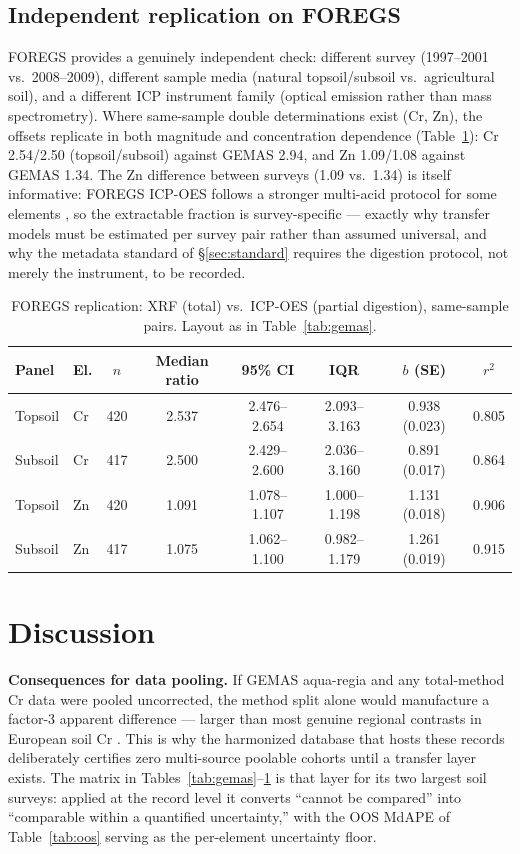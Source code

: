 \documentclass[11pt]{article}
\begin{document}
\subsection{Independent replication on FOREGS}
\label{sec:foregs}
FOREGS provides a genuinely independent check: different survey (1997--2001
vs.\ 2008--2009), different sample media (natural topsoil/subsoil vs.\
agricultural soil), and a different ICP instrument family (optical emission
rather than mass spectrometry). Where same-sample double determinations
exist (Cr, Zn), the offsets replicate in both magnitude and concentration
dependence (Table~\ref{tab:foregs}): Cr 2.54/2.50 (topsoil/subsoil) against
GEMAS 2.94, and Zn 1.09/1.08 against GEMAS 1.34. The Zn difference between
surveys (1.09 vs.\ 1.34) is itself informative: FOREGS ICP-OES follows a
stronger multi-acid protocol for some elements \cite{salminen2005}, so the
extractable fraction is survey-specific --- exactly why transfer models
must be estimated per survey pair rather than assumed universal, and why
the metadata standard of \S\ref{sec:standard} requires the digestion
protocol, not merely the instrument, to be recorded.

\begin{table}[!t]
\centering
\caption{FOREGS replication: XRF (total) vs.\ ICP-OES (partial digestion),
same-sample pairs. Layout as in Table~\ref{tab:gemas}.}
\label{tab:foregs}
\small
\begin{tabular}{llcccccc}
\toprule
Panel & El. & $n$ & Median ratio & 95\% CI & IQR & $b$ (SE) & $r^2$ \\
\midrule
Topsoil & Cr & 420 & 2.537 & 2.476--2.654 & 2.093--3.163 & 0.938 (0.023) & 0.805 \\
Subsoil & Cr & 417 & 2.500 & 2.429--2.600 & 2.036--3.160 & 0.891 (0.017) & 0.864 \\
Topsoil & Zn & 420 & 1.091 & 1.078--1.107 & 1.000--1.198 & 1.131 (0.018) & 0.906 \\
Subsoil & Zn & 417 & 1.075 & 1.062--1.100 & 0.982--1.179 & 1.261 (0.019) & 0.915 \\
\bottomrule
\end{tabular}
\end{table}

\section{Discussion}

\textbf{Consequences for data pooling.} If GEMAS aqua-regia and any
total-method Cr data were pooled uncorrected, the method split alone would
manufacture a factor-3 apparent difference --- larger than most genuine
regional contrasts in European soil Cr \cite{devos2006}. This is why the
harmonized database that hosts these records deliberately certifies zero
multi-source poolable cohorts until a transfer layer exists. The matrix in
Tables~\ref{tab:gemas}--\ref{tab:foregs} is that layer for its two largest
soil surveys: applied at the record level it converts ``cannot be
compared'' \cite{unep2025} into ``comparable within a quantified
uncertainty,'' with the OOS MdAPE of Table~\ref{tab:oos} serving as the
per-element uncertainty floor.
\end{document}
